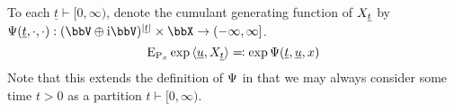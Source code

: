 \begin{definition}
  \label{definition:aff-fdds}
  To each $\underline t \vdash [0,\infty)$, denote the cumulant generating function of $X_{\underline t}$ by $\aff(\underline t, \cdot, \cdot): (\vecSpace \oplus \im\vecSpace)^{|\underline t|} \times \stateSpace \rightarrow (-\infty,\infty]$.
  \begin{equation*}
    {\operatorname{E}}_{{\operatorname{P}}_x} \exp{\langle \underline{u}, X_{\underline t} \rangle} \eqqcolon \exp\Psi(\underline t, \underline{u}, x)
  \end{equation*}
  Note that this extends the definition of $\Psi$ in that we may always consider some time $t > 0$ as a partition $t \vdash [0,\infty)$.
\end{definition}

